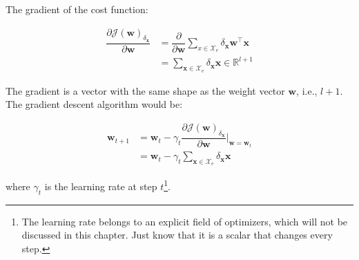 \documentclass{article}
\begin{document}
The gradient of the cost function:

\begin{align}
    \dfrac
        {\partial {\mathcal{J}(\mathbf{w})}_{\delta_{\mathbf{x}}}}
        {\partial \mathbf{w}}
    &= 
    \dfrac
        {\partial}
        {\partial\mathbf{w}} 
    \sum_{x\in\mathcal{X}_{\text{e}}} 
    \delta_{\mathbf{x}} 
    \mathbf{w}^\top 
    \mathbf{x}
    \\
    &= 
    \sum_{\mathbf{x}\in\mathcal{X}_{\text{e}}}
    \delta_{\mathbf{x}}
    \mathbf{x} 
    \in \mathbb{R}^{l+1}
\end{align}

The gradient is a vector with the same shape as the weight vector $\mathbf{w}$, i.e., $l+1$. The gradient descent algorithm would be:

\begin{align}
    \mathbf{w}_{t+1} 
    &= 
        \mathbf{w}_{t} - 
        \gamma_{t} 
        \dfrac{\partial {\mathcal{J}(\mathbf{w})}_{\delta_{\mathbf{x}}}}
            {\partial \mathbf{w}}
        \Biggl|_{\mathbf{w}=\mathbf{w}_t}
    \\
    &= 
        \mathbf{w}_{t} -
        \gamma_{t}
        \sum_{\mathbf{x}\in\mathcal{X}_{\text{e}}}
        \delta_{\mathbf{x}}\mathbf{x}
\end{align}

where $\gamma_{t}$ is the learning rate at step $t$\footnote{
    The learning rate belongs to an explicit field of optimizers, which will not be discussed in this chapter. Just know that it is a scalar that changes every step.
}.
\end{document}
